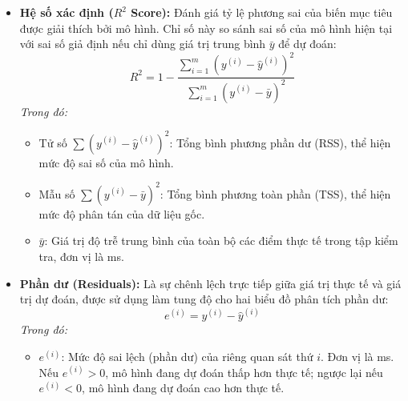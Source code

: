 \begin{itemize}
    \item \textbf{Hệ số xác định ($R^2$ Score):} Đánh giá tỷ lệ phương sai của biến mục tiêu được giải thích bởi mô hình. Chỉ số này so sánh sai số của mô hình hiện tại với sai số giả định nếu chỉ dùng giá trị trung bình $\bar{y}$ để dự đoán:
    \begin{equation}
        R^2 = 1 - \frac{\sum_{i=1}^{m} \left(y^{(i)} - \hat{y}^{(i)}\right)^2}{\sum_{i=1}^{m} \left(y^{(i)} - \bar{y}\right)^2}
    \end{equation}
    \textit{Trong đó:}
    \begin{itemize}
        \item Tử số $\sum (y^{(i)} - \hat{y}^{(i)})^2$: Tổng bình phương phần dư (RSS), thể hiện mức độ sai số của mô hình.
        \item Mẫu số $\sum (y^{(i)} - \bar{y})^2$: Tổng bình phương toàn phần (TSS), thể hiện mức độ phân tán của dữ liệu gốc.
        \item $\bar{y}$: Giá trị độ trễ trung bình của toàn bộ các điểm thực tế trong tập kiểm tra, đơn vị là ms.
    \end{itemize}

    \item \textbf{Phần dư (Residuals):} Là sự chênh lệch trực tiếp giữa giá trị thực tế và giá trị dự đoán, được sử dụng làm tung độ cho hai biểu đồ phân tích phần dư:
    \begin{equation}
        e^{(i)} = y^{(i)} - \hat{y}^{(i)}
    \end{equation}
    \textit{Trong đó:}
    \begin{itemize}
        \item $e^{(i)}$: Mức độ sai lệch (phần dư) của riêng quan sát thứ $i$. Đơn vị là ms. Nếu $e^{(i)} > 0$, mô hình đang dự đoán thấp hơn thực tế; ngược lại nếu $e^{(i)} < 0$, mô hình đang dự đoán cao hơn thực tế.
    \end{itemize}
\end{itemize}
